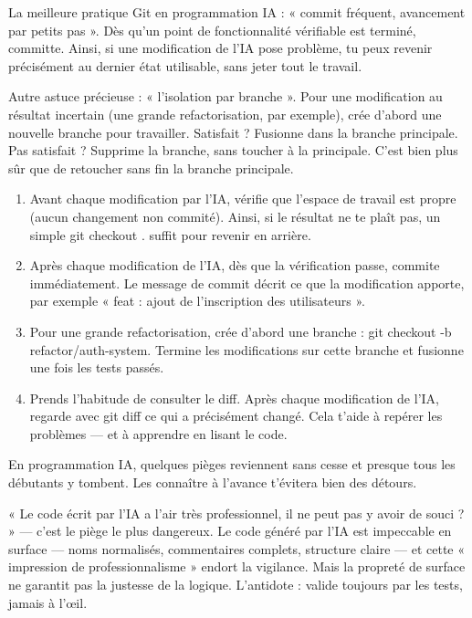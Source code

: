 La meilleure pratique Git en programmation IA : « commit fréquent, avancement par petits pas ». Dès qu'un point de fonctionnalité vérifiable est terminé, committe. Ainsi, si une modification de l'IA pose problème, tu peux revenir précisément au dernier état utilisable, sans jeter tout le travail.

Autre astuce précieuse : « l'isolation par branche ». Pour une modification au résultat incertain (une grande refactorisation, par exemple), crée d'abord une nouvelle branche pour travailler. Satisfait ? Fusionne dans la branche principale. Pas satisfait ? Supprime la branche, sans toucher à la principale. C'est bien plus sûr que de retoucher sans fin la branche principale.

\begin{enumerate}
  \item Avant chaque modification par l'IA, vérifie que l'espace de travail est propre (aucun changement non commité). Ainsi, si le résultat ne te plaît pas, un simple git checkout . suffit pour revenir en arrière.
  \item Après chaque modification de l'IA, dès que la vérification passe, commite immédiatement. Le message de commit décrit ce que la modification apporte, par exemple « feat : ajout de l'inscription des utilisateurs ».
  \item Pour une grande refactorisation, crée d'abord une branche : git checkout -b refactor/auth-system. Termine les modifications sur cette branche et fusionne une fois les tests passés.
  \item Prends l'habitude de consulter le diff. Après chaque modification de l'IA, regarde avec git diff ce qui a précisément changé. Cela t'aide à repérer les problèmes — et à apprendre en lisant le code.
\end{enumerate}


En programmation IA, quelques pièges reviennent sans cesse et presque tous les débutants y tombent. Les connaître à l'avance t'évitera bien des détours.


« Le code écrit par l'IA a l'air très professionnel, il ne peut pas y avoir de souci ? » — c'est le piège le plus dangereux. Le code généré par l'IA est impeccable en surface — noms normalisés, commentaires complets, structure claire — et cette « impression de professionnalisme » endort la vigilance. Mais la propreté de surface ne garantit pas la justesse de la logique. L'antidote : valide toujours par les tests, jamais à l'œil.

